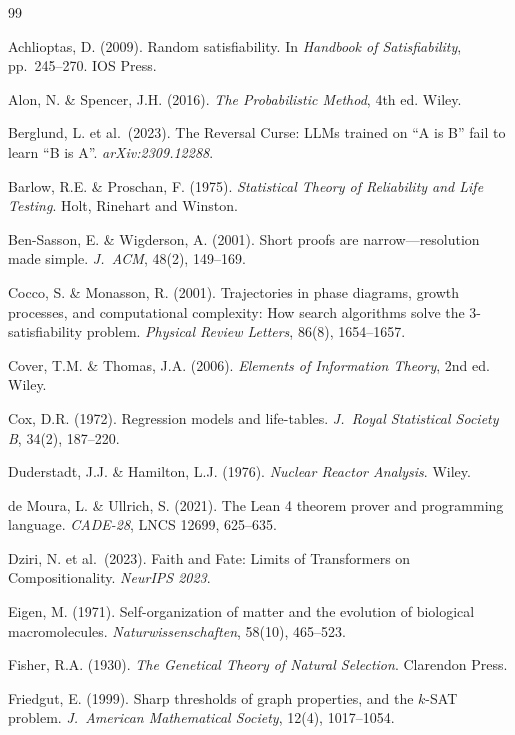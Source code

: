 \documentclass[11pt,a4paper]{article}
\begin{document}
\begin{thebibliography}{99}

Achlioptas, D. (2009).
Random satisfiability.
In \emph{Handbook of Satisfiability}, pp.~245--270. IOS Press.

Alon, N. \& Spencer, J.H. (2016).
\emph{The Probabilistic Method}, 4th ed.
Wiley.

Berglund, L. et al.\ (2023).
The Reversal Curse: LLMs trained on ``A is B'' fail to learn ``B is A''.
\emph{arXiv:2309.12288}.

Barlow, R.E. \& Proschan, F. (1975).
\emph{Statistical Theory of Reliability and Life Testing}.
Holt, Rinehart and Winston.

Ben-Sasson, E. \& Wigderson, A. (2001).
Short proofs are narrow---resolution made simple.
\emph{J.\ ACM}, 48(2), 149--169.

Cocco, S. \& Monasson, R. (2001).
Trajectories in phase diagrams, growth processes, and computational complexity: How search algorithms solve the 3-satisfiability problem.
\emph{Physical Review Letters}, 86(8), 1654--1657.

Cover, T.M. \& Thomas, J.A. (2006).
\emph{Elements of Information Theory}, 2nd ed.
Wiley.

Cox, D.R. (1972).
Regression models and life-tables.
\emph{J.\ Royal Statistical Society B}, 34(2), 187--220.

Duderstadt, J.J. \& Hamilton, L.J. (1976).
\emph{Nuclear Reactor Analysis}.
Wiley.

de Moura, L. \& Ullrich, S. (2021).
The Lean 4 theorem prover and programming language.
\emph{CADE-28}, LNCS 12699, 625--635.

Dziri, N. et al.\ (2023).
Faith and Fate: Limits of Transformers on Compositionality.
\emph{NeurIPS 2023}.

Eigen, M. (1971).
Self-organization of matter and the evolution of biological macromolecules.
\emph{Naturwissenschaften}, 58(10), 465--523.

Fisher, R.A. (1930).
\emph{The Genetical Theory of Natural Selection}.
Clarendon Press.

Friedgut, E. (1999).
Sharp thresholds of graph properties, and the $k$-SAT problem.
\emph{J.\ American Mathematical Society}, 12(4), 1017--1054.


\end{thebibliography}
\end{document}
